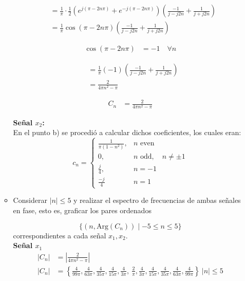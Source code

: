 \documentclass[12pt,a4paper]{report}
\begin{document}
\begin{enumerate}[label=\alph*),left=0pt]
\begin{itemize}[left=0pt]
      $$
      \begin{aligned}
      &= \frac{1}{\pi} \cdot \frac{1}{2} \left( e^{j(\pi - 2n\pi)} + e^{-j(\pi - 2n\pi)} \right) \left( \frac{-1}{j - j2n} + \frac{1}{j + j2n} \right) \\
      &= \frac{1}{\pi} \cos(\pi - 2n\pi) \left( \frac{-1}{j - j2n} + \frac{1}{j + j2n} \right)
      \end{aligned}
      $$
      
      $$
      \begin{aligned}
      \cos(\pi - 2n\pi) &= -1 \quad \forall n
      \end{aligned}
      $$
      
      $$
      \begin{aligned}
      &= \frac{1}{\pi} (-1) \left( \frac{-1}{j - j2n} + \frac{1}{j + j2n} \right) \\
      &= \frac{2}{4\pi n^{2} - \pi}
      \end{aligned}
      $$
      
      $$
      \begin{aligned}
      C_{n} &= \frac{2}{4\pi n^{2} - \pi}
      \end{aligned}
      $$
            

      \textbf{Señal $x_2$:}\\
      En el punto b) se procedió a calcular dichos coeficientes, los cuales eran:
      $$
      c_n = \begin{cases}
	      \frac{1}{\pi(1-n^2)}, & n \text{ even} \\[5pt]
	      0, & n \text{ odd}, \quad n \neq \pm 1 \\
	      \frac{j}{4}, & n=-1 \\
	      \frac{-j}{4} & n=1
      \end{cases}
      $$

    \item Considerar $|n| \leq 5$ y realizar el espectro de frecuencias de ambas señales en fase, esto es, graficar los 
      pares ordenados

      $$\{(n, \text{Arg}(C_n)) \mid -5 \leq n \leq 5\}$$
      correspondientes a cada señal $x_1, x_2$.\\

  \textbf{Señal $x_1$}\\
      $$
      \begin{aligned}
        |C_{n} |&=|\frac{2}{4\pi n^{2} -\pi } | \\
        |C_{n} |&=\left\{\frac{4}{99\pi } ,\frac{4}{63\pi } ,\frac{4}{35\pi } ,\frac{4}{15\pi } ,\frac{4}{3\pi } ,\ \frac{2}{\pi } ,\frac{4}{3\pi } ,\frac{4}{15\pi } ,\frac{4}{35\pi } ,\frac{4}{63\pi } ,\frac{4}{99\pi }\right\} \ |n|\leq 5
        \end{aligned}
        $$
        

\end{itemize}
\end{enumerate}
\end{document}
